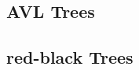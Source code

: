\subsection{AVL Trees}
\subsection{red-black Trees}



\begin{yapcode}
\end{yapcode}
\begin{yapcode}
\end{yapcode}
\begin{yapcode}
\end{yapcode}
